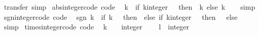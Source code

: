 \begin{isabellebody}
\ {\isacharparenleft}{\kern0pt}transfer{\isacharcomma}{\kern0pt}\ simp{\isacharparenright}{\kern0pt}{\isacharplus}{\kern0pt}%
\endisatagproof
{\isafoldproof}%
%
\isadelimproof
\isanewline
%
\endisadelimproof
\isanewline
{}\isamarkupfalse%
\ abs{\isacharunderscore}{\kern0pt}integer{\isacharunderscore}{\kern0pt}code\ {\isacharbrackleft}{\kern0pt}code{\isacharbrackright}{\kern0pt}{\isacharcolon}{\kern0pt}\isanewline
\ \ {\isachardoublequoteopen}{\isasymbar}k{\isasymbar}\ {\isacharequal}{\kern0pt}\ {\isacharparenleft}{\kern0pt}if\ {\isacharparenleft}{\kern0pt}k{\isacharcolon}{\kern0pt}{\isacharcolon}{\kern0pt}integer{\isacharparenright}{\kern0pt}\ {\isacharless}{\kern0pt}\ {}\ then\ {\isacharminus}{\kern0pt}\ k\ else\ k{\isacharparenright}{\kern0pt}{\isachardoublequoteclose}\isanewline
%
\isadelimproof
\ \ %
\endisadelimproof
%
\isatagproof
{}\isamarkupfalse%
\ simp%
\endisatagproof
{\isafoldproof}%
%
\isadelimproof
\isanewline
%
\endisadelimproof
\isanewline
{}\isamarkupfalse%
\ sgn{\isacharunderscore}{\kern0pt}integer{\isacharunderscore}{\kern0pt}code\ {\isacharbrackleft}{\kern0pt}code{\isacharbrackright}{\kern0pt}{\isacharcolon}{\kern0pt}\isanewline
\ \ {\isachardoublequoteopen}sgn\ k\ {\isacharequal}{\kern0pt}\ {\isacharparenleft}{\kern0pt}if\ k\ {\isacharequal}{\kern0pt}\ {}\ then\ {}\ else\ if\ {\isacharparenleft}{\kern0pt}k{\isacharcolon}{\kern0pt}{\isacharcolon}{\kern0pt}integer{\isacharparenright}{\kern0pt}\ {\isacharless}{\kern0pt}\ {}\ then\ {\isacharminus}{\kern0pt}\ {}\ else\ {}{\isacharparenright}{\kern0pt}{\isachardoublequoteclose}\isanewline
%
\isadelimproof
\ \ %
\endisadelimproof
%
\isatagproof
{}\isamarkupfalse%
\ simp%
\endisatagproof
{\isafoldproof}%
%
\isadelimproof
\isanewline
%
\endisadelimproof
\isanewline
{}\isamarkupfalse%
\ times{\isacharunderscore}{\kern0pt}integer{\isacharunderscore}{\kern0pt}code\ {\isacharbrackleft}{\kern0pt}code{\isacharbrackright}{\kern0pt}{\isacharcolon}{\kern0pt}\isanewline
\ \ {\isachardoublequoteopen}k\ {\isacharasterisk}{\kern0pt}\ {}\ {\isacharequal}{\kern0pt}\ {\isacharparenleft}{\kern0pt}{}{\isacharcolon}{\kern0pt}{\isacharcolon}{\kern0pt}integer{\isacharparenright}{\kern0pt}{\isachardoublequoteclose}\isanewline
\ \ {\isachardoublequoteopen}{}\ {\isacharasterisk}{\kern0pt}\ l\ {\isacharequal}{\kern0pt}\ {\isacharparenleft}{\kern0pt}{}{\isacharcolon}{\kern0pt}{\isacharcolon}{\kern0pt}integer{\isacharparenright}{\kern0pt}{\isachardoublequoteclose}\isanewline

\end{isabellebody}

